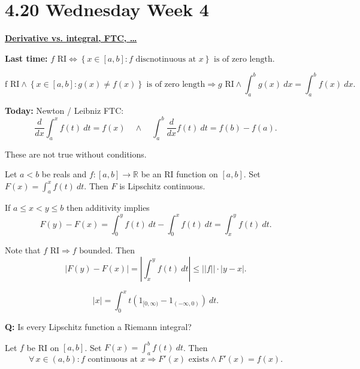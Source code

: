 \documentclass{notes}
\begin{document}
\newpage

\section{4.20 Wednesday Week 4}

{\boldmath \bfseries \underline{Derivative vs. integral, FTC, \dots}}

{\boldmath \bfseries Last time:} $\text{$f$ RI} \Leftrightarrow \left \{ x \in [a, b] : \text{$f$ discnotinuous at $x$} \right \} \text{ is of zero length}$.

\begin{cor}
  \[
    \text{f RI} \land \left \{ x \in [a, b] : g(x) \neq f(x) \right \} \text{ is of zero length} \Rightarrow \text{$g$ RI} \land \int_a^b g(x)\ dx = \int_a^b f(x)\ dx.
  \]
\end{cor}

{\boldmath \bfseries Today:} Newton / Leibniz FTC: 
\[
  \frac{d}{dx} \int_a^x f(t)\ dt = f(x) \quad \land \quad \int_a^b \frac{d}{dx} f(t)\ dt = f(b) - f(a).
\]

\begin{note}
  These are not true without conditions.
\end{note}

\begin{lem}
  Let $a < b$ be reals and $f \colon [a, b] \to \mathbb R$ be an RI function on $[a, b]$.
  Set $F(x) = \int_a^x f(t)\ dt$.
  Then $F$ is Lipschitz continuous.
\end{lem}

\begin{prf}
  If $a \leq x < y \leq b$ then additivity implies 
  \[
    F(y) - F(x) = \int_0^y f(t)\ dt - \int_0^x f(t)\ dt = \int_x^y f(t)\ dt.
  \]
  
  Note that $\text{$f$ RI} \Rightarrow \text{$f$ bounded}$.
  Then 
  \[
    \left | F(y) - F(x) \right | = \left | \int_x^y f(t)\ dt \right | \leq ||f|| \cdot \left | y - x \right |.
  \]
\end{prf}

\begin{eg}
  \[
    \left | x \right | = \int_0^x t (1_{[0, \infty)} - 1_{(-\infty, 0)})\ dt.
  \]
\end{eg}

{\boldmath \bfseries Q:} Is every Lipschitz function a Riemann integral?

\begin{lem}
  Let $f$ be RI on $[a, b]$.
  Set $F(x) = \int_a^b f(t)\ dt$.
  Then 
  \[
    \forall \, x \in (a, b): \text{$f$ continuous at $x$} \Rightarrow \text{$F'(x)$ exists} \land F'(x) = f(x).
  \]
\end{lem}
\end{document}
